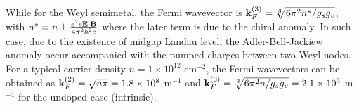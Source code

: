 \documentclass[UTF8,a4paper]{article}
\begin{document}
\begin{large}
While for the Weyl semimetal,
the Fermi wavevector is ${\bf k}_{F}^{(3)}=\sqrt[3]{6\pi^{2} n^{*}/g_{s}g_{v}}$,
with $n^{*}=n\pm \frac{e^{2}e{\bf E}\cdot{\bf B}}{4\pi^{2}\hbar^{2}c}$
where the later term is due to the chiral anomaly.
In such case, due to the existence of midgap Landau level, the Adler-Bell-Jackiew anomaly occur\cite{Ezawa M}
accompanied with the pumped charges between two Weyl nodes.
For a typical carrier density $n=1\times 10^{12}$ cm$^{-2}$, the Fermi wavevectors can be obtained as
${\bf k}_{F}^{(2)}=\sqrt{n\pi}=1.8\times 10^{8}$ m$^{-1}$ and
${\bf k}_{F}^{(3)}=\sqrt[3]{6\pi^{2} n/g_{s}g_{v}}=2.1\times 10^{5}$ m$^{-1}$ for the undoped case (intrinsic).



\end{large}
\end{document}

